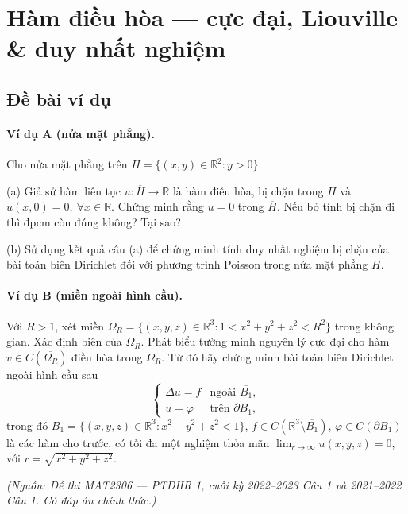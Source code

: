 
\section{Hàm điều hòa --- cực đại, Liouville \& duy nhất nghiệm}

\subsection*{Đề bài ví dụ}

\paragraph{Ví dụ A (nửa mặt phẳng).}\leavevmode

Cho nửa mặt phẳng trên $H=\{(x,y)\in\mathbb{R}^2 : y>0\}$.

(a) Giả sử hàm liên tục $u:\overline{H}\to\mathbb{R}$ là hàm điều hòa, bị chặn trong $H$ và $u(x,0)=0,\ \forall x\in\mathbb{R}$. Chứng minh rằng $u=0$ trong $\overline{H}$. Nếu bỏ tính bị chặn đi thì đpcm còn đúng không? Tại sao?

(b) Sử dụng kết quả câu (a) để chứng minh tính duy nhất nghiệm bị chặn của bài toán biên Dirichlet đối với phương trình Poisson trong nửa mặt phẳng $H$.

\paragraph{Ví dụ B (miền ngoài hình cầu).}\leavevmode

Với $R>1$, xét miền $\Omega_R=\{(x,y,z)\in\mathbb{R}^3 : 1<x^2+y^2+z^2<R^2\}$ trong không gian. Xác định biên của $\Omega_R$. Phát biểu tường minh nguyên lý cực đại cho hàm $v\in C(\overline{\Omega_R})$ điều hòa trong $\Omega_R$. Từ đó hãy chứng minh bài toán biên Dirichlet ngoài hình cầu sau
\[
\begin{cases}
\Delta u = f & \text{ngoài } \overline{B_1},\\
u = \varphi & \text{trên } \partial B_1,
\end{cases}
\]
trong đó $B_1=\{(x,y,z)\in\mathbb{R}^3 : x^2+y^2+z^2<1\}$, $f\in C(\mathbb{R}^3\setminus\overline{B_1})$, $\varphi\in C(\partial B_1)$ là các hàm cho trước, có tối đa một nghiệm thỏa mãn $\lim_{r\to\infty}u(x,y,z)=0$, với $r=\sqrt{x^2+y^2+z^2}$.

\emph{\small(Nguồn: Đề thi MAT2306 --- PTĐHR 1, cuối kỳ 2022--2023 Câu 1 và 2021--2022 Câu 1. Có đáp án chính thức.)}

